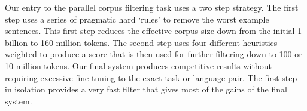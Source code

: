 Our entry to the parallel corpus filtering task uses a two step strategy.  The first step uses a series of pragmatic hard ‘rules' to remove the worst example sentences.  This first step reduces the effective corpus size down from the initial 1 billion to 160 million tokens. The second step uses four different heuristics weighted to produce a score that is then used for further filtering down to 100 or 10 million tokens.  Our final system produces competitive results without requiring excessive fine tuning to the exact task or language pair. The first step in isolation provides a very fast filter that gives most of the gains of the final system.
